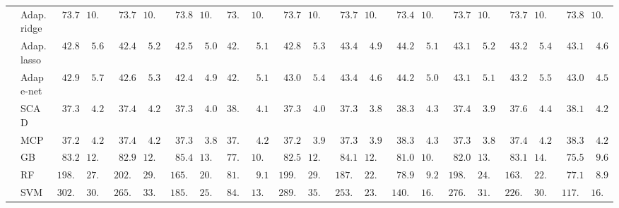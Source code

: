 \begin{tabular}{llllllllllllllllllllll}
	& Adap. ridge  & $\phantom{0}73.784$ & $10.181$ & $\phantom{0}73.787$ & $10.164$ & $\phantom{0}73.861$ & $10.202$ & $73.854$ & $10.153$ & $\phantom{0}73.778$ & $10.179$ & $\phantom{0}73.746$ & $10.158$ & $\phantom{0}73.441$ & $10.110$ & $\phantom{0}73.776$ & $10.182$ & $\phantom{0}73.780$ & $10.161$ & $\phantom{0}73.824$ & $10.181$ \\
	& Adap. lasso  & $\phantom{0}42.845$ & $\phantom{0}5.641$ & $\phantom{0}42.472$ & $\phantom{0}5.211$ & $\phantom{0}42.533$ & $\phantom{0}5.083$ & $42.990$ & $\phantom{0}5.199$ & $\phantom{0}42.877$ & $\phantom{0}5.350$ & $\phantom{0}43.476$ & $\phantom{0}4.981$ & $\phantom{0}44.246$ & $\phantom{0}5.150$ & $\phantom{0}43.131$ & $\phantom{0}5.257$ & $\phantom{0}43.239$ & $\phantom{0}5.499$ & $\phantom{0}43.163$ & $\phantom{0}4.630$ \\
	& Adap e-net  & $\phantom{0}42.917$ & $\phantom{0}5.766$ & $\phantom{0}42.629$ & $\phantom{0}5.341$ & $\phantom{0}42.490$ & $\phantom{0}4.903$ & $42.938$ & $\phantom{0}5.161$ & $\phantom{0}43.030$ & $\phantom{0}5.453$ & $\phantom{0}43.441$ & $\phantom{0}4.662$ & $\phantom{0}44.209$ & $\phantom{0}5.063$ & $\phantom{0}43.128$ & $\phantom{0}5.170$ & $\phantom{0}43.271$ & $\phantom{0}5.535$ & $\phantom{0}43.084$ & $\phantom{0}4.584$ \\
	& SCAD  & $\phantom{0}37.303$ & $\phantom{0}4.209$ & $\phantom{0}37.471$ & $\phantom{0}4.223$ & $\phantom{0}37.340$ & $\phantom{0}4.068$ & $38.138$ & $\phantom{0}4.188$ & $\phantom{0}37.386$ & $\phantom{0}4.074$ & $\phantom{0}37.334$ & $\phantom{0}3.811$ & $\phantom{0}38.331$ & $\phantom{0}4.316$ & $\phantom{0}37.467$ & $\phantom{0}3.947$ & $\phantom{0}37.610$ & $\phantom{0}4.405$ & $\phantom{0}38.147$ & $\phantom{0}4.202$ \\
	& MCP  & $\phantom{0}37.215$ & $\phantom{0}4.218$ & $\phantom{0}37.483$ & $\phantom{0}4.251$ & $\phantom{0}37.350$ & $\phantom{0}3.870$ & $37.939$ & $\phantom{0}4.216$ & $\phantom{0}37.272$ & $\phantom{0}3.960$ & $\phantom{0}37.353$ & $\phantom{0}3.910$ & $\phantom{0}38.339$ & $\phantom{0}4.301$ & $\phantom{0}37.316$ & $\phantom{0}3.873$ & $\phantom{0}37.485$ & $\phantom{0}4.211$ & $\phantom{0}38.311$ & $\phantom{0}4.253$ \\
	& GB  & $\phantom{0}83.291$ & $12.997$ & $\phantom{0}82.947$ & $12.626$ & $\phantom{0}85.440$ & $13.945$ & $77.345$ & $10.415$ & $\phantom{0}82.590$ & $12.592$ & $\phantom{0}84.123$ & $12.625$ & $\phantom{0}81.013$ & $10.477$ & $\phantom{0}82.050$ & $13.473$ & $\phantom{0}83.129$ & $14.241$ & $\phantom{0}75.555$ & $\phantom{0}9.653$ \\
	& RF  & $198.508$ & $27.756$ & $202.759$ & $29.572$ & $165.941$ & $20.152$ & $81.054$ & $\phantom{0}9.128$ & $199.952$ & $29.700$ & $187.196$ & $22.123$ & $\phantom{0}78.906$ & $\phantom{0}9.264$ & $198.061$ & $24.227$ & $163.565$ & $22.576$ & $\phantom{0}77.152$ & $\phantom{0}8.954$ \\
	& SVM  & $302.187$ & $30.360$ & $265.240$ & $33.960$ & $185.200$ & $25.322$ & $84.909$ & $13.330$ & $289.392$ & $35.942$ & $253.536$ & $23.836$ & $140.961$ & $16.431$ & $276.504$ & $31.471$ & $226.215$ & $30.586$ & $117.569$ & $16.724$ \\
	\hline 
\end{tabular}